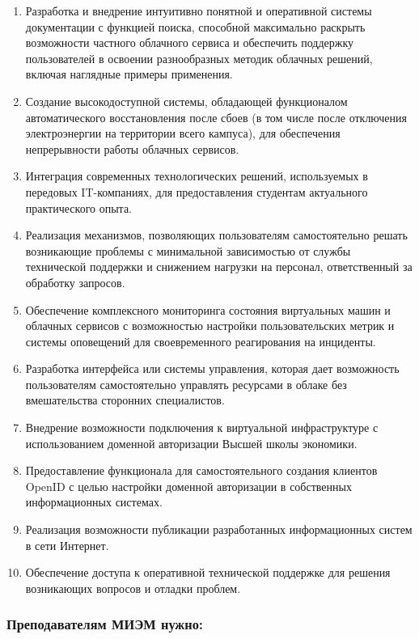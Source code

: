\documentclass[14pt, a4paper]{extarticle}
\begin{document}
\begin{enumerate}

\item Разработка и внедрение интуитивно понятной и оперативной системы документации с функцией поиска, способной максимально раскрыть возможности частного облачного сервиса и обеспечить поддержку пользователей в освоении разнообразных методик облачных решений, включая наглядные примеры применения.
\item Создание высокодоступной системы, обладающей функционалом автоматического восстановления после сбоев (в том числе после отключения электроэнергии на территории всего кампуса), для обеспечения непрерывности работы облачных сервисов.
\item Интеграция современных технологических решений, используемых в передовых IT-компаниях, для предоставления студентам актуального практического опыта.
\item Реализация механизмов, позволяющих пользователям самостоятельно решать возникающие проблемы с минимальной зависимостью от службы технической поддержки и снижением нагрузки на персонал, ответственный за обработку запросов.
\item Обеспечение комплексного мониторинга состояния виртуальных машин и облачных сервисов с возможностью настройки пользовательских метрик и системы оповещений для своевременного реагирования на инциденты.
\item Разработка интерфейса или системы управления, которая дает возможность пользователям самостоятельно управлять ресурсами в облаке без вмешательства сторонних специалистов.
\item Внедрение возможности подключения к виртуальной инфраструктуре с использованием доменной авторизации Высшей школы экономики.
\item Предоставление функционала для самостоятельного создания клиентов OpenID с целью настройки доменной авторизации в собственных информационных системах.
\item Реализация возможности публикации разработанных информационных систем в сети Интернет.
\item Обеспечение доступа к оперативной технической поддержке для решения возникающих вопросов и отладки проблем.

\end{enumerate}

\subsubsection*{Преподавателям МИЭМ нужно:}
\end{document}
